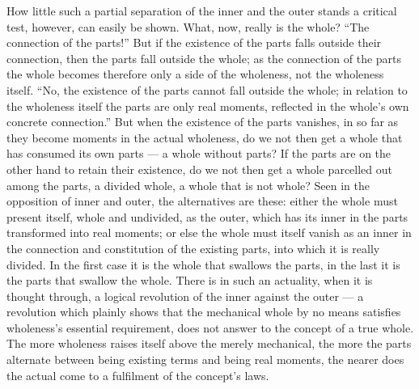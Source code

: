\documentclass[12pt,a4paper]{book}
\begin{document}
How little such a partial separation of the inner and the outer stands a
critical test, however, can easily be shown. What, now, really is the whole?
``The connection of the parts!'' But if the existence of the parts falls outside
their connection, then the parts fall outside the whole; as the connection of
the parts the whole becomes therefore only a side of the wholeness, not the
wholeness itself. ``No, the existence of the parts cannot
fall outside the whole; in relation to the wholeness itself the parts are only
real moments, reflected in the whole's own concrete connection.'' But when the
existence of the parts vanishes, in so far as they become moments in the actual
wholeness, do we not then get a whole that has consumed its own parts --- a
whole without parts? If the parts are on the other hand to retain their
existence, do we not then get a whole parcelled out among the parts, a divided
whole, a whole that is not whole? Seen in the opposition of inner and outer,
the alternatives are these: either the whole must present itself, whole and
undivided, as the outer, which has its inner in the parts transformed into real
moments; or else the whole must itself vanish as an inner in the connection and
constitution of the existing parts, into which it is really divided. In the
first case it is the whole that swallows the parts, in the last it is the parts
that swallow the whole. There is in such an actuality, when it is thought
through, a logical revolution of the inner against the outer --- a revolution
which plainly shows that the mechanical whole by no means satisfies wholeness's
essential requirement, does not answer to the concept of a true whole.
The more wholeness raises itself above the merely mechanical, the more the
parts alternate between being existing terms and being real moments, the nearer
does the actual come to a fulfilment of the concept's laws.
\end{document}
